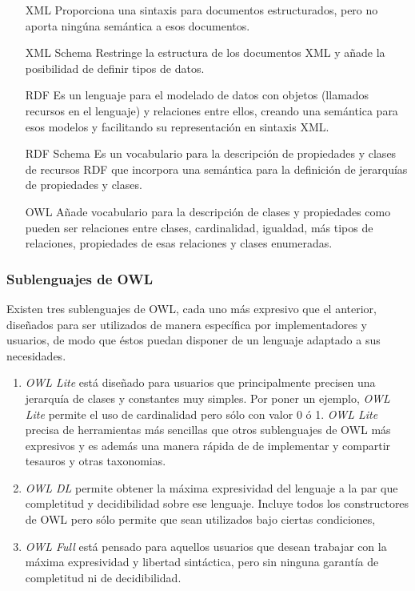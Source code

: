 		\begin{itemize}
			\item[XML] Proporciona una sintaxis para documentos estructurados, pero no aporta ningúna semántica a esos documentos.
			\item[XML Schema] Restringe la estructura de los documentos XML y añade la posibilidad de definir tipos de datos.

			\item[RDF] Es un lenguaje para el modelado de datos con objetos (llamados recursos en el lenguaje) y relaciones entre ellos, creando una semántica para esos modelos y facilitando su representación en sintaxis XML.

			\item[RDF Schema] Es un vocabulario para la descripción de propiedades y clases de recursos RDF que incorpora una semántica para la definición de jerarquías de propiedades y clases.

			\item[OWL] Añade vocabulario para la descripción de clases y propiedades como pueden ser relaciones entre clases, cardinalidad, igualdad, más tipos de relaciones, propiedades de esas relaciones y clases enumeradas. 
		\end{itemize}
	
		\subsubsection{Sublenguajes de OWL}
		Existen tres sublenguajes de OWL, cada uno más expresivo que el anterior, diseñados para ser utilizados de manera específica por implementadores y usuarios, de modo que éstos puedan disponer de un lenguaje adaptado a sus necesidades. 
	
		\begin{enumerate}
			
			\item \textit{OWL Lite} está diseñado para usuarios que principalmente precisen una jerarquía de clases y constantes muy simples. Por poner un ejemplo, \textit{OWL Lite} permite el uso de cardinalidad pero sólo con valor 0 ó 1. \textit{OWL Lite} precisa de herramientas más sencillas que otros sublenguajes de OWL más expresivos y es además una manera rápida de de implementar y compartir tesauros y otras taxonomias.
		
			\item \textit{OWL DL} permite obtener la máxima expresividad del lenguaje a la par que completitud y decidibilidad sobre ese lenguaje. Incluye todos los constructores de OWL pero sólo permite que sean utilizados bajo ciertas condiciones, 
	
			\item \textit{OWL Full} está pensado para aquellos usuarios que desean trabajar con la máxima expresividad y libertad sintáctica, pero sin ninguna garantía de completitud ni de decidibilidad. 

		\end{enumerate}
		
